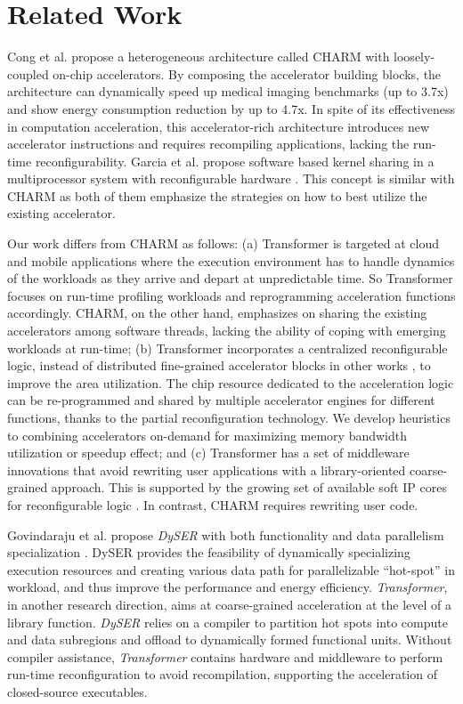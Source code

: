 \section{Related Work}
\label{sec_related}
Cong et al. \cite{accrich,cong-islped12,cong-saw11} propose a
heterogeneous architecture called CHARM with loosely-coupled on-chip
accelerators. By composing the accelerator building blocks, the
architecture can dynamically speed up medical imaging benchmarks (up
to 3.7x) and show energy consumption reduction by up to 4.7x.  In
spite of its effectiveness in computation acceleration, this
accelerator-rich architecture introduces new accelerator instructions and
requires recompiling applications, lacking the run-time
reconfigurability.  Garcia et al. propose software based kernel sharing in a
multiprocessor system with reconfigurable hardware
	\cite{Garcia:2008iy}. This concept is similar with CHARM as both
of them emphasize the strategies on how to best utilize the existing
accelerator.

Our work differs from CHARM \cite{accrich,cong-islped12,cong-saw11} as
follows: (a) Transformer is targeted at cloud and mobile applications
where the execution environment has to handle dynamics of the
workloads as they arrive and depart at unpredictable time. So
Transformer focuses on run-time profiling workloads and reprogramming
acceleration functions accordingly. CHARM, on the other hand,
emphasizes on sharing the existing accelerators among software
threads, lacking the ability of coping with emerging workloads at
run-time; (b) Transformer incorporates a centralized reconfigurable
logic, instead of distributed fine-grained accelerator blocks in other works 
\cite{accrich}, to improve the area utilization. The chip
resource dedicated to the acceleration logic can be re-programmed and
shared by multiple accelerator engines for different functions, thanks
to the partial reconfiguration technology.  We develop heuristics to
combining accelerators on-demand for maximizing memory bandwidth
utilization or speedup effect; and (c) Transformer has a set of
middleware innovations that avoid rewriting user applications with a
library-oriented coarse-grained approach. This is supported by the
growing set of available soft IP cores for reconfigurable logic
\cite{opencores,design-reuse,free-ip}. In contrast, CHARM requires
rewriting user code.

Govindaraju et al. propose {\em DySER} with both functionality and
data parallelism specialization \cite{Govindaraju:2012fn,Govindaraju:HPCA11}. DySER
provides the feasibility of dynamically specializing execution
resources and creating various data path for parallelizable
``hot-spot'' in workload, and thus improve the performance and energy
efficiency. {\em Transformer}, in another research direction, aims at
coarse-grained acceleration at the level of a library function. {\em
  DySER} relies on a compiler to partition hot spots into compute and
data subregions and offload to dynamically formed functional
units. Without compiler assistance, {\em Transformer} contains
hardware and middleware to perform run-time reconfiguration to avoid
recompilation, supporting the acceleration of closed-source
executables.

